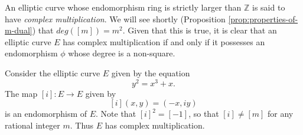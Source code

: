 



An elliptic curve whose endomorphism ring is strictly larger than $\mathbb{Z}$ is
said to have \emph{complex multiplication}.  We will see shortly (Proposition \ref{prop:properties-of-m-dual}) that $deg([m]) =
m^{2}$.  Given that this is true, it is clear that an elliptic curve $E$ has complex
multiplication if and only if it possesses an endomorphism $\phi$ whose degree is a non-square.

\begin{example}
  \label{ex:cm-example}
  Consider the elliptic curve $E$ given by the equation
  \begin{equation*}
    y^{2} = x^{3} + x.
  \end{equation*}
  The map $\left[ i \right] \colon E \rightarrow E$ given by
  \begin{equation*}
    \left[ i \right](x,y) = (-x,iy)
  \end{equation*}
  is an endomorphism of $E$.  Note that $\left[ i \right]^{2} = \left[ -1 \right]$,
  so that $\left[ i \right] \neq \left[ m \right]$ for any rational integer $m$.
  Thus $E$ has complex multiplication.
\end{example}

